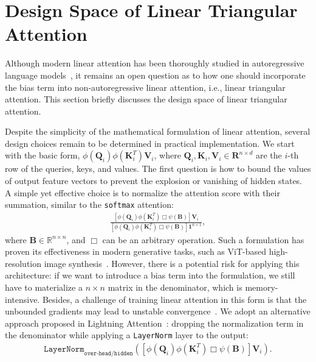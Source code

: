 \documentclass[]{bytedance_seed}
\begin{document}
\section{Design Space of Linear Triangular Attention}

Although modern linear attention has been thoroughly studied in autoregressive language models~\cite{kimiteam2025kimilinearexpressiveefficient,minimax2025minimax01scalingfoundationmodels}, it remains an open question as to how one should incorporate the bias term into non-autoregressive linear attention, i.e., linear triangular attention. This section briefly discusses the design space of linear triangular attention. 

Despite the simplicity of the mathematical formulation of linear attention, several design choices remain to be determined in practical implementation. We start with the basic form, $\phi(\mathbf{Q}_i)\phi(\mathbf{K}_i^T)\mathbf{V}_i$, where $\mathbf{Q}_i, \mathbf{K}_i, \mathbf{V}_i\in\mathbf{R}^{n\times d}$ are the $i$-th row of the queries, keys, and values. The first question is how to bound the values of output feature vectors to prevent the explosion or vanishing of hidden states. A simple yet effective choice is to normalize the attention score with their summation, similar to the \texttt{softmax} attention:
\begin{align}
\frac{\left[\phi(\mathbf{Q}_i)\phi(\mathbf{K}_i^T)\Box\psi(\mathbf{B})\right]\mathbf{V}_i}{\left[\phi(\mathbf{Q}_i)\phi(\mathbf{K}_i^T)\Box\psi(\mathbf{B})\right]\mathbf{1}^{n\times 1}},
\end{align}
where $\mathbf{B}\in\mathbb{R}^{n\times n}$, and $\Box$ can be an arbitrary operation. Such a formulation has proven its effectiveness in modern generative tasks, such as ViT-based high-resolution image synthesis~\cite{xie2023efficient,xie2024sana}. However, there is a potential risk for applying this architecture: if we want to introduce a bias term into the formulation, we still have to materialize a $n\times n$ matrix in the denominator, which is memory-intensive. Besides, a challenge of training linear attention in this form is that the unbounded gradients may lead to unstable convergence~\cite{qin2022devil}. We adopt an alternative approach proposed in Lightning Attention~\cite{qin2024lightning}: dropping the normalization term in the denominator while applying a \texttt{LayerNorm} layer to the output:
\begin{align}
\mathtt{LayerNorm}_{\texttt{over-head/hidden}}\left(\left[\phi(\mathbf{Q}_i)\phi(\mathbf{K}_i^T)\Box\psi(\mathbf{B})\right]\mathbf{V}_i\right).
\end{align}
\end{document}
